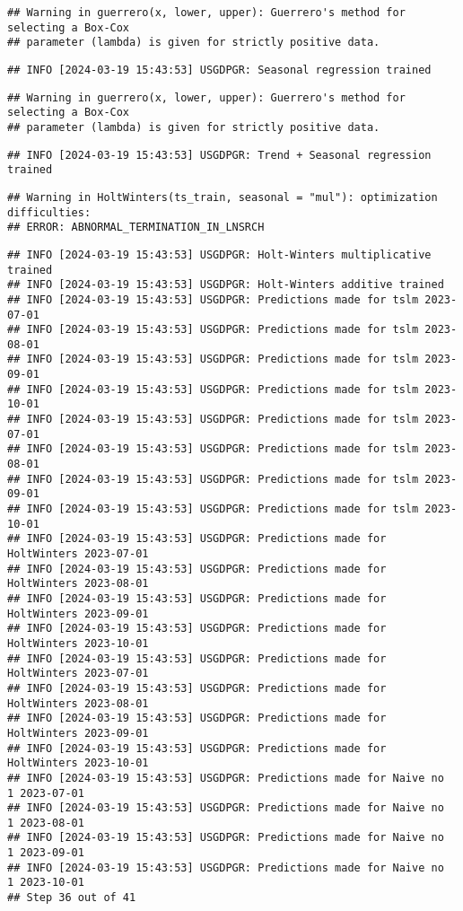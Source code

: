 \documentclass[
]{article}
\begin{document}
\begin{verbatim}
## Warning in guerrero(x, lower, upper): Guerrero's method for selecting a Box-Cox
## parameter (lambda) is given for strictly positive data.
\end{verbatim}

\begin{verbatim}
## INFO [2024-03-19 15:43:53] USGDPGR: Seasonal regression trained
\end{verbatim}

\begin{verbatim}
## Warning in guerrero(x, lower, upper): Guerrero's method for selecting a Box-Cox
## parameter (lambda) is given for strictly positive data.
\end{verbatim}

\begin{verbatim}
## INFO [2024-03-19 15:43:53] USGDPGR: Trend + Seasonal regression trained
\end{verbatim}

\begin{verbatim}
## Warning in HoltWinters(ts_train, seasonal = "mul"): optimization difficulties:
## ERROR: ABNORMAL_TERMINATION_IN_LNSRCH
\end{verbatim}

\begin{verbatim}
## INFO [2024-03-19 15:43:53] USGDPGR: Holt-Winters multiplicative trained
## INFO [2024-03-19 15:43:53] USGDPGR: Holt-Winters additive trained
## INFO [2024-03-19 15:43:53] USGDPGR: Predictions made for tslm 2023-07-01
## INFO [2024-03-19 15:43:53] USGDPGR: Predictions made for tslm 2023-08-01
## INFO [2024-03-19 15:43:53] USGDPGR: Predictions made for tslm 2023-09-01
## INFO [2024-03-19 15:43:53] USGDPGR: Predictions made for tslm 2023-10-01
## INFO [2024-03-19 15:43:53] USGDPGR: Predictions made for tslm 2023-07-01
## INFO [2024-03-19 15:43:53] USGDPGR: Predictions made for tslm 2023-08-01
## INFO [2024-03-19 15:43:53] USGDPGR: Predictions made for tslm 2023-09-01
## INFO [2024-03-19 15:43:53] USGDPGR: Predictions made for tslm 2023-10-01
## INFO [2024-03-19 15:43:53] USGDPGR: Predictions made for HoltWinters 2023-07-01
## INFO [2024-03-19 15:43:53] USGDPGR: Predictions made for HoltWinters 2023-08-01
## INFO [2024-03-19 15:43:53] USGDPGR: Predictions made for HoltWinters 2023-09-01
## INFO [2024-03-19 15:43:53] USGDPGR: Predictions made for HoltWinters 2023-10-01
## INFO [2024-03-19 15:43:53] USGDPGR: Predictions made for HoltWinters 2023-07-01
## INFO [2024-03-19 15:43:53] USGDPGR: Predictions made for HoltWinters 2023-08-01
## INFO [2024-03-19 15:43:53] USGDPGR: Predictions made for HoltWinters 2023-09-01
## INFO [2024-03-19 15:43:53] USGDPGR: Predictions made for HoltWinters 2023-10-01
## INFO [2024-03-19 15:43:53] USGDPGR: Predictions made for Naive no  1 2023-07-01
## INFO [2024-03-19 15:43:53] USGDPGR: Predictions made for Naive no  1 2023-08-01
## INFO [2024-03-19 15:43:53] USGDPGR: Predictions made for Naive no  1 2023-09-01
## INFO [2024-03-19 15:43:53] USGDPGR: Predictions made for Naive no  1 2023-10-01
## Step 36 out of 41
\end{verbatim}
\end{document}
